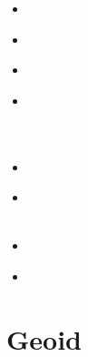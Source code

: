 \begin{scriptsize}
\begin{itemize}
\item[\twothousandnine] 
\textcite{simp09} \\
\item[\twothousandten] 
\textcite{resb10} \\
\item[\twothousandeleven] 
\textcite{freh11} \\
\item[\twothousandtwelve] 
\textcite{reds12} \\
\textcite{grsc12} \\
\textcite{scsc12} \\
\item[\twothousandthirteen] 
\textcite{regc13} \\
\item[\twothousandfourteen] 
\textcite{freh14} \\ 
\textcite{frex14} \\
\item[\twothousandsixteen] 
\textcite{frsc16} \\
\item[\twothousandtwentyone] 
\textcite{nafo21} \\
\end{itemize}
\end{scriptsize}

\section{Geoid}

